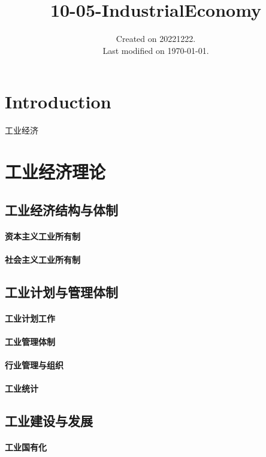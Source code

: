 \documentclass[UTF8]{../../RepresentationUniverse}
\begin{document}
\title{10-05-IndustrialEconomy}
\date{Created on 20221222.\\   Last modified on \today.}
\maketitle
\tableofcontents


\chapter{Introduction}


工业经济



 
\chapter{工业经济理论}
\section{工业经济结构与体制}
    \subsubsection{资本主义工业所有制}
    \subsubsection{社会主义工业所有制}
\section{工业计划与管理体制}
    \subsubsection{工业计划工作}
    \subsubsection{工业管理体制}
    \subsubsection{行业管理与组织}
    \subsubsection{工业统计}
\section{工业建设与发展}
    \subsubsection{工业国有化}
\end{document}
